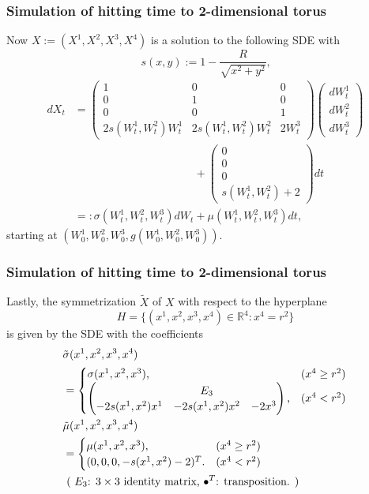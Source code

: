 \documentclass[dvipdfmx,11pt]{beamer}		%
\newcommand{\R}{\mathbb{R}}
\begin{document}
\begin{frame}\frametitle{Simulation of hitting time to 2-dimensional torus}
	Now \( X := (X^1,X^2,X^3,X^4) \) is a solution to the following SDE with
	\[
		s(x,y) := 1 - \frac{R}{\sqrt{x^2+y^2}}\text{,}
	\]
	\begin{align*}
		d X_t &= 
		\begin{pmatrix}
		    1 & 0 & 0 \\
		    0 & 1 & 0 \\
		    0 & 0 & 1 \\
		    2 s (W^1_t,W^2_t) W^1_t & 2 s (W^1_t,W^2_t) W^2_t & 2W^3_t 
		\end{pmatrix}
		\begin{pmatrix}
		    dW^1_t \\ dW^2_t \\ dW^3_t
		\end{pmatrix}	\\
		&\hspace{130pt}+
		\begin{pmatrix}
		    0 \\ 0 \\ 0 \\
		    s (W^1_t,W^2_t) + 2 
		\end{pmatrix}
		dt	\\
		&=: \sigma(W^1_t,W^2_t,W^3_t) dW_t + \mu(W^1_t,W^2_t,W^3_t) dt	\text{,}
	\end{align*}
	starting at \((W^1_0,W^2_0,W^3_0,g(W^1_0,W^2_0,W^3_0)) \).
\end{frame}
%
\begin{frame}\frametitle{Simulation of hitting time to 2-dimensional torus}
	Lastly, the symmetrization \( \tilde{X} \) of \( X \) with respect to the hyperplane
	\[
		    H = \{ (x^1, x^2, x^3, x^4) \in \R^4 \colon x^4 = r^2 \}
	\]
	is given by the SDE with the coefficients
	\begin{align*}
		&\tilde{\sigma} (x^1, x^2, x^3, x^4) \\
		&=	
		\begin{cases}
			\sigma (x^1,x^2,x^3) \text{,} &  (x^4 \geq r^2)	\\
			\begin{pmatrix}
				& E_3 \\
				-2 s (x^1,x^2) x^1 & - 2 s (x^1,x^2) x^2 & - 2x^3 
			\end{pmatrix}	\text{,}
			& (x^4 < r^2)
		\end{cases}		\\
		&\tilde{\mu}	(x^1, x^2, x^3, x^4)	\\
		&=
		\begin{cases}
			\mu(x^1,x^2,x^3)	\text{,}			&	(x^4 \ge r^2)	\\
			(0, 0, 0, -s(x^1,x^2)-2 )^T	\text{.}	& (x^4<r^2)
		\end{cases}		\\
		& \text{ ( \( E_3 \): \( 3 \times 3 \) identity matrix, \( \bullet^T \): transposition. ) }
		\end{align*}
\end{frame}
%
%
\end{document}
